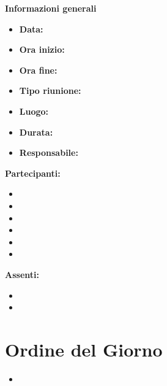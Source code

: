 \documentclass[a4paper,12pt]{article}
\begin{document}
\clearpage
{\large \textbf{Informazioni generali}}
{\footnotesize
{}

\begin{itemize}
    \item \textbf{Data:} %
    \item \textbf{Ora inizio:} %
    \item \textbf{Ora fine:} %
    \item \textbf{Tipo riunione:}%
    \item \textbf{Luogo:} %
    \item \textbf{Durata:} %
    \item \textbf{Responsabile:} %
\end{itemize}

\vspace{0.2cm}

\textbf{Partecipanti:}
\begin{itemize}
    \item %
    \item %
    \item %
    \item %
    \item %
    \item %
\end{itemize}

\textbf{Assenti:}
\begin{itemize}
    \item %
    \item %
\end{itemize}
}

\vspace{0.5cm}

\vspace{0.8cm}

\clearpage
\tableofcontents
\thispagestyle{empty} %
\clearpage

\section{Ordine del Giorno}
\begin{itemize}
    \item %
\end{itemize}

\end{document}
